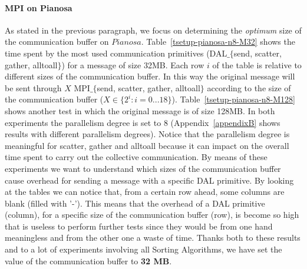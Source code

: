 \paragraph{MPI on Pianosa}
\label{test-env-pianosa}
As stated in the previous paragraph, we focus on determining the \textit{optimum} size of the communication buffer on $Pianosa$. Table~\ref{tsetup-pianosa-n8-M32} shows the time spent by the most used communication primitives (DAL$\_\lbrace$send, scatter, gather, alltoall$\rbrace$) for a message of size 32MB. Each row $i$ of the table is relative to different sizes of the communication buffer. In this way the original message will be sent through $X$ MPI$\_\lbrace$send, scatter, gather, alltoall$\rbrace$ according to the size of the communication buffer ($X \in \lbrace 2^i : i = 0...18 \rbrace$). Table~\ref{tsetup-pianosa-n8-M128} shows another test in which the original message is of size 128MB. In both experiments the parallelism degree is set to 8 (Appendix~\ref{appendixB} shows results with different parallelism degrees). Notice that the parallelism degree is meaningful for scatter, gather and alltoall because it can impact on the overall time spent to carry out the collective communication. By means of these experiments we want to understand which sizes of the communication buffer cause overhead for sending a message with a specific DAL primitive. By looking at the tables we can notice that, from a certain row ahead, some columns are blank (filled with '-'). This means that the overhead of a DAL primitive (column), for a specific size of the communication buffer (row), is become so high that is useless to perform further tests since they would be from one hand meaningless and from the other one a waste of time. Thanks both to these results and to a lot of experiments involving all Sorting Algorithms, we have set the value of the communication buffer to \textbf{32 MB}. 

